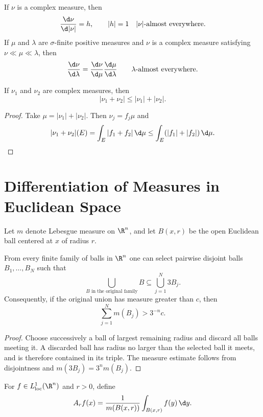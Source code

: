 \begin{cor}
If $\nu$ is a complex measure, then
\[
\frac{\d\nu}{\d|\nu|}=h,
\qquad |h|=1\quad |\nu|\text{-almost everywhere}.
\]
If $\mu$ and $\lambda$ are $\sigma$-finite positive measures and $\nu$ is a complex measure satisfying $\nu\ll\mu\ll\lambda$, then
\[
\frac{\d\nu}{\d\lambda}
 =\frac{\d\nu}{\d\mu}\frac{\d\mu}{\d\lambda}
\qquad\lambda\text{-almost everywhere}.
\]
\end{cor}

\begin{prop}
If $\nu_1$ and $\nu_2$ are complex measures, then
\[
|\nu_1+\nu_2|\leq|\nu_1|+|\nu_2|.
\]
\end{prop}

\begin{proof}
Take $\mu=|\nu_1|+|\nu_2|$. Then $\nu_j=f_j\mu$ and
\[
|\nu_1+\nu_2|(E)=\int_E|f_1+f_2|\,\d\mu
\leq\int_E(|f_1|+|f_2|)\,\d\mu.
\]
\end{proof}

\section{Differentiation of Measures in Euclidean Space}

Let $m$ denote Lebesgue measure on $\R^n$, and let $B(x,r)$ be the open Euclidean ball centered at $x$ of radius $r$.

\begin{lem}
From every finite family of balls in $\R^n$ one can select pairwise disjoint balls $B_1,\dots,B_N$ such that
\[
\bigcup_{B\text{ in the original family}}B
\subseteq\bigcup_{j=1}^N3B_j.
\]
Consequently, if the original union has measure greater than $c$, then
\[
\sum_{j=1}^Nm(B_j)>3^{-n}c.
\]
\end{lem}

\begin{proof}
Choose successively a ball of largest remaining radius and discard all balls meeting it. A discarded ball has radius no larger than the selected ball it meets, and is therefore contained in its triple. The measure estimate follows from disjointness and $m(3B_j)=3^nm(B_j)$.
\end{proof}

\begin{de}
For $f\in L^1_{\loc}(\R^n)$ and $r>0$, define
\[
A_rf(x)=\frac1{m(B(x,r))}\int_{B(x,r)}f(y)\,\d y.
\]
\end{de}


